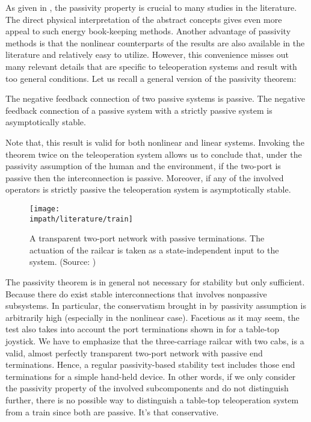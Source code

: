 As given in , the passivity property is crucial to many studies in the literature. The direct 
physical interpretation of the abstract concepts gives even more appeal to such energy book-keeping methods. Another 
advantage of passivity methods is that the nonlinear counterparts of the results are also available in the literature 
and relatively easy to utilize. However, this convenience misses out many relevant details that are specific to 
teleoperation systems and result with too general conditions. Let us recall a general version of the passivity theorem:

\begin{thm} The negative feedback connection of two passive systems is passive. The negative feedback connection of a passive system with
a strictly passive system is asymptotically stable.\end{thm}

Note that, this result is valid for both nonlinear and linear systems. Invoking the theorem twice on the teleoperation 
system allows us to conclude that, under the passivity assumption of the human and the environment, if the two-port is 
passive then the interconnection is passive. Moreover, if any of the involved operators is strictly passive the teleoperation 
system is asymptotically stable. 

\begin{figure}%
\centering
\texttt{[image: \\impath/literature/train]}%
\caption[A transparent two-port network with passive terminations]{A transparent two-port network with passive 
terminations. The actuation of the railcar is taken as a state-independent input to the system. (Source: \cite{train})}%
\label{fig:lit:train}%
\end{figure}


The passivity theorem is in general not necessary for stability but only sufficient. Because there do exist stable 
interconnections that involves nonpassive subsystems. In particular, the conservatism brought in by passivity 
assumption is arbitrarily high (especially in the nonlinear case). Facetious as it may seem, the test also takes 
into account the port terminations shown in  for a table-top joystick. We have to emphasize 
that the three-carriage railcar with two cabs, is a valid, almost perfectly transparent two-port network with 
passive end terminations. Hence, a regular passivity-based stability test includes those end terminations for 
a simple hand-held device. In other words, if we only consider the passivity property of the involved subcomponents and do not 
distinguish further, there is no possible way to distinguish a table-top teleoperation system from a train since
both are passive. It's that conservative.



